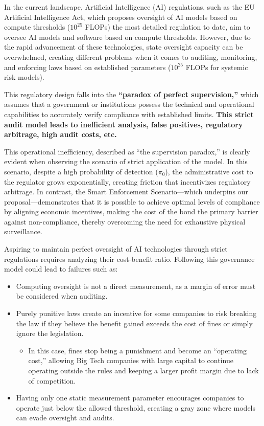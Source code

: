 In the current landscape, Artificial Intelligence (AI) regulations, such as the EU Artificial Intelligence Act, which proposes oversight of AI models based on compute thresholds ($10^{25}$ FLOPs) the most detailed regulation to date, aim to oversee AI models and software based on compute thresholds. However, due to the rapid advancement of these technologies, state oversight capacity can be overwhelmed, creating different problems when it comes to auditing, monitoring, and enforcing laws based on established parameters ($10^{25}$ FLOPs for systemic risk models).

This regulatory design falls into the \textbf{“paradox of perfect supervision,”} which assumes that a government or institutions possess the technical and operational capabilities to accurately verify compliance with established limits. \textbf{This strict audit model leads to inefficient analysis, false positives, regulatory arbitrage, high audit costs, etc.}

This operational inefficiency, described as “the supervision paradox,” is clearly evident when observing the scenario of strict application of the model. In this scenario, despite a high probability of detection ($\pi_0$), the administrative cost to the regulator grows exponentially, creating friction that incentivizes regulatory arbitrage. In contrast, the Smart Enforcement Scenario—which underpins our proposal—demonstrates that it is possible to achieve optimal levels of compliance by aligning economic incentives, making the cost of the bond the primary barrier against non-compliance, thereby overcoming the need for exhaustive physical surveillance.


Aspiring to maintain perfect oversight of AI technologies through strict regulations requires analyzing their cost-benefit ratio. Following this governance model could lead to failures such as:

\begin{itemize}
    \item Computing oversight is not a direct measurement, as a margin of error must be considered when auditing.
    
    \item Purely punitive laws create an incentive for some companies to risk breaking the law if they believe the benefit gained exceeds the cost of fines or simply ignore the legislation.
    \begin{itemize}
        \item In this case, fines stop being a punishment and become an ``operating cost,'' allowing Big Tech companies with large capital to continue operating outside the rules and keeping a larger profit margin due to lack of competition.
    \end{itemize}
    
    \item Having only one static measurement parameter encourages companies to operate just below the allowed threshold, creating a gray zone where models can evade oversight and audits.
\end{itemize}

